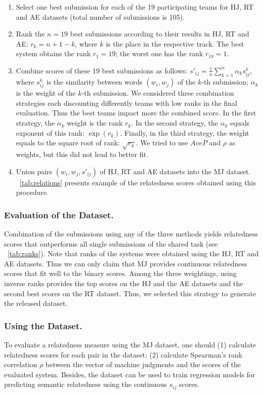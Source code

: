 \documentclass[runningheads,a4paper]{llncs}
\begin{document}
\begin{enumerate}
  \item Select one best submission for each of the $19$ participating teams for HJ, RT and AE datasets (total number of submissions is 105).
  \item Rank the $n=19$ best submissions according to their results in HJ, RT and AE: $r_k = n + 1 - k$, where $k$ is the place in the respective track. The best system obtains the rank $r_1=19$; the worst one has the rank $r_{19}=1$.
  \item Combine scores of these 19 best submissions as follows: $s'_{ij}=\frac{1}{n} \sum^{n}_{k=1} \alpha_k s^{k}_{ij}$, where $s^{k}_{ij}$ is the similarity between words $(w_i, w_j)$ of the $k$-th submission; $\alpha_k$ is the weight of the $k$-th submission. We considered three combination strategies each discounting differently teams with low ranks in the final evaluation. Thus the best teams impact more the combined score. In the first strategy, the $\alpha_k$ weight is the rank $r_k$. In the second strategy, the $\alpha_k$ equals exponent of this rank: $\exp(r_k)$. Finally, in the third strategy, the weight equals to the  square root of rank: $\sqrt{r_k}$. We tried to  use  $AveP$ and $\rho$ as weights, but this did not lead to better fit.
  \item Union pairs $(w_i, w_j, s'_{ij})$ of HJ, RT and AE datasets into the MJ dataset. \tablename~\ref{tab:relations} presents example of the relatedness scores obtained using this procedure. 
\end{enumerate}

\subsubsection{Evaluation of the Dataset.}

Combination of the submissions using any of the three methods yields relatedness scores that outperforms all single submissions of the shared task (see \tablename~\ref{tab:ranks}). Note that ranks of the systems were obtained using the HJ, RT and AE datasets. Thus we can only claim that MJ provides continuous relatedness scores that fit well to the binary scores. Among the three weightings, using inverse ranks  provides the top scores on the HJ and the AE datasets and the second best scores on the RT dataset. Thus, we selected this strategy to generate the released dataset. 

\subsubsection{Using the Dataset.} To evaluate a relatedness measure using the MJ dataset, one should (1) calculate relatedness scores for each pair in the dataset; (2) calculate Spearman's rank correlation $\rho$ between the vector of machine judgments and the scores of the evaluated system. Besides, the dataset can be used to train regression models for predicting semantic relatedness using the continuous $s_{ij}$ scores.
\end{document}
